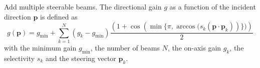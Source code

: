 Add multiple steerable beams. The directional gain $g$ as a function
of the incident direction $\mathbf{p}$ is defined as
%
\begin{equation}
g(\mathbf{p}) = g_{\textrm{min}} + \sum\limits_{k=1}^N (g_k-g_{\textrm{min}})\frac{\left(1+\cos\left(\min\{\pi,\arccos(s_k \left(\mathbf{p}\cdot\mathbf{p}_k\right)\right)\})\right)}{2}
\end{equation}
%
with the minimum gain $g_\textrm{min}$, the number of beams $N$, the
on-axis gain $g_k$, the selectivity $s_k$ and the steering vector
$\mathbf{p}_k$.


